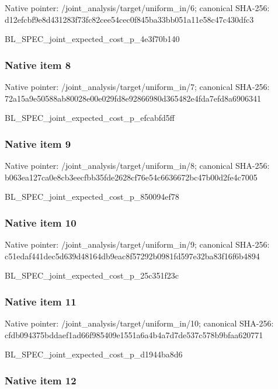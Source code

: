 \documentclass[10pt,a4paper]{article}
\begin{document}
Native pointer: /joint\_analysis/target/uniform\_in/6; canonical SHA-256: d12efcbf9e8d431283f73fc8\allowbreak{}2cee54cec0f845ba33bb051a\allowbreak{}11e58c47c430dfc3


BL\_SPEC\_joint\_expected\_c\allowbreak{}ost\_p\_4e3f70b140


\subsubsection{Native item 8}


Native pointer: /joint\_analysis/target/uniform\_in/7; canonical SHA-256: 72a15a9e50588ab80028e00e\allowbreak{}029fd8e92866980d365482e4\allowbreak{}fda7efd8a6906341


BL\_SPEC\_joint\_expected\_c\allowbreak{}ost\_p\_efcabfd5ff


\subsubsection{Native item 9}


Native pointer: /joint\_analysis/target/uniform\_in/8; canonical SHA-256: b063ea127ca0e8cb3eecfbb3\allowbreak{}5fde2628cf76e54c6636672b\allowbreak{}c47b00d2fe4c7005


BL\_SPEC\_joint\_expected\_c\allowbreak{}ost\_p\_850094ef78


\subsubsection{Native item 10}


Native pointer: /joint\_analysis/target/uniform\_in/9; canonical SHA-256: c51edaf441dec5d639d48164\allowbreak{}db9eac8f57292b0981fd597e\allowbreak{}32ba83f16f6b4894


BL\_SPEC\_joint\_expected\_c\allowbreak{}ost\_p\_25c351f23c


\subsubsection{Native item 11}


Native pointer: /joint\_analysis/target/uniform\_in/10; canonical SHA-256: cfdb094375bddaef1ad66f98\allowbreak{}5409e1551a6a4b4a7d7de537\allowbreak{}c578b9bfaa620771


BL\_SPEC\_joint\_expected\_c\allowbreak{}ost\_p\_d1944ba8d6


\subsubsection{Native item 12}
\end{document}
